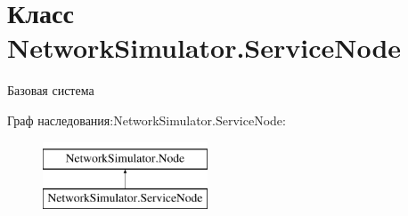 \hypertarget{class_network_simulator_1_1_service_node}{}\section{Класс Network\+Simulator.\+Service\+Node}
\label{class_network_simulator_1_1_service_node}


Базовая система  


Граф наследования\+:Network\+Simulator.\+Service\+Node\+:\begin{figure}[H]
\begin{center}
\leavevmode
\includegraphics[height=2.000000cm]{class_network_simulator_1_1_service_node}
\end{center}
\end{figure}

